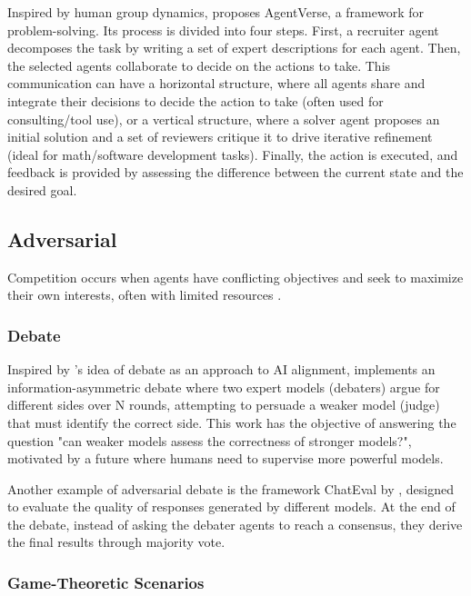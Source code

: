 Inspired by human group dynamics, \textcite{chen2023agentversefacilitatingmultiagentcollaboration} proposes AgentVerse, a framework for problem-solving. Its process is divided into four steps. First, a recruiter agent decomposes the task by writing a set of expert descriptions for each agent. Then, the selected agents collaborate to decide on the actions to take. This communication can have a horizontal structure, where all agents share and integrate their decisions to decide the action to take (often used for consulting/tool use), or a vertical structure, where a solver agent proposes an initial solution and a set of reviewers critique it to drive iterative refinement (ideal for math/software development tasks). Finally, the action is executed, and feedback is provided by assessing the difference between the current state and the desired goal.


\subsection{Adversarial}
Competition occurs when agents have conflicting objectives and seek to maximize their own interests, often with limited resources \parencite{tran2025multiagentcollaborationmechanismssurvey, Li2024}.

\subsubsection{Debate}
Inspired by \textcite{irving2018aisafetydebate}'s idea of debate as an approach to AI alignment, \textcite{khan_debating_2024} implements an information-asymmetric debate where two expert models (debaters) argue for different sides over N rounds, attempting to persuade a weaker model (judge) that must identify the correct side. This work has the objective of answering the question "can weaker models assess the correctness of stronger models?", motivated by a future where humans need to supervise more powerful models.

Another example of adversarial debate is the framework ChatEval by \textcite{chan2023chatevalbetterllmbasedevaluators}, designed to evaluate the quality of responses generated by different models. At the end of the debate, instead of asking the debater agents to reach a consensus, they derive the final results through majority vote.

\subsubsection{Game-Theoretic Scenarios}

